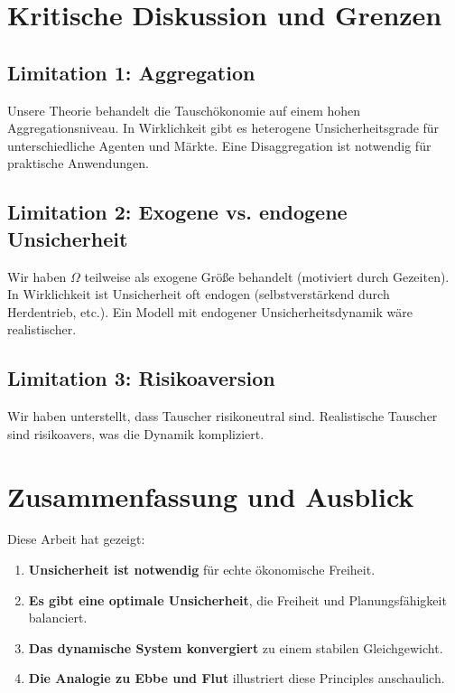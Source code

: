 \documentclass[a4paper, 12pt, twoside, openright]{report}
\theoremstyle{definition}
\theoremstyle{definition}
\begin{document}
\section{Kritische Diskussion und Grenzen}

\subsection{Limitation 1: Aggregation}

Unsere Theorie behandelt die Tauschökonomie auf einem hohen Aggregationsniveau. In Wirklichkeit gibt es heterogene Unsicherheitsgrade für unterschiedliche Agenten und Märkte. Eine Disaggregation ist notwendig für praktische Anwendungen.

\subsection{Limitation 2: Exogene vs. endogene Unsicherheit}

Wir haben $\Omega$ teilweise als exogene Größe behandelt (motiviert durch Gezeiten). In Wirklichkeit ist Unsicherheit oft endogen (selbstverstärkend durch Herdentrieb, etc.). Ein Modell mit endogener Unsicherheitsdynamik wäre realistischer.

\subsection{Limitation 3: Risikoaversion}

Wir haben unterstellt, dass Tauscher risikoneutral sind. Realistische Tauscher sind risikoavers, was die Dynamik kompliziert.

\section{Zusammenfassung und Ausblick}

Diese Arbeit hat gezeigt:

\begin{enumerate}
    \item \textbf{Unsicherheit ist notwendig} für echte ökonomische Freiheit.
    \item \textbf{Es gibt eine optimale Unsicherheit}, die Freiheit und Planungsfähigkeit balanciert.
    \item \textbf{Das dynamische System konvergiert} zu einem stabilen Gleichgewicht.
    \item \textbf{Die Analogie zu Ebbe und Flut} illustriert diese Principles anschaulich.
\end{enumerate}
\end{document}
